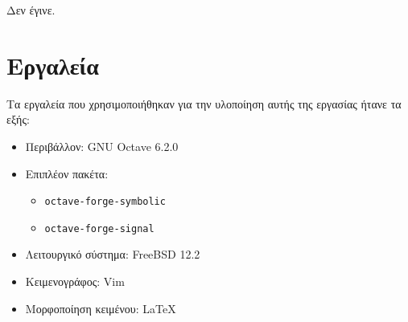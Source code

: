 \documentclass{article}
\begin{document}
Δεν έγινε.

\pagebreak
\section{Εργαλεία}
Τα εργαλεία που χρησιμοποιήθηκαν για την υλοποίηση αυτής της εργασίας ήτανε
τα εξής:
\begin{itemize}
        \item Περιβάλλον: GNU Octave 6.2.0
        \item Επιπλέον πακέτα:
        \begin{itemize}
                \item \lstinline{octave-forge-symbolic}
                \item \lstinline{octave-forge-signal}
        \end{itemize}
        \item Λειτουργικό σύστημα: FreeBSD 12.2
        \item Κειμενογράφος: Vim
        \item Μορφοποίηση κειμένου: \LaTeX
\end{itemize}
\end{document}
